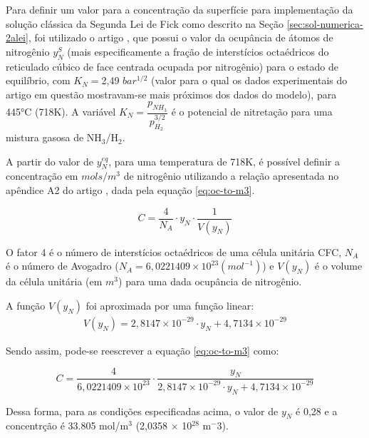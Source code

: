 Para definir um valor para a concentração da superfície para implementação da solução clássica da Segunda Lei de Fick como descrito na Seção \autoref{sec:sol-numerica-2alei}, foi utilizado o artigo  \cite{christiansen2008nitrogen}, que possui o valor da ocupância de átomos de nitrogênio $y_N^{S}$ (mais especificamente a fração de interstícios octaédricos do reticulado cúbico de face centrada ocupada por nitrogênio) para o estado de equilíbrio, com $K_N=$2,49 $bar^{1/2}$ (valor para o qual os dados experimentais do artigo em questão mostravam-se mais próximos dos dados do modelo), para 445°C (718K). A variável $K_N=\dfrac{p_{NH_3}}{p_{H_2}^{3/2}}$ é o potencial de nitretação para uma mistura gasosa de NH$_3$/H$_2$.

A partir do valor de $y_N^{eq}$, para uma temperatura de 718K, é possível definir a concentração em $mols/m^3$ de nitrogênio utilizando a relação apresentada no apêndice A2 do artigo \cite{jespersen2016modelling}, dada pela equação \autoref{eq:oc-to-m3}.

\begin{equation} \label{eq:oc-to-m3}
	C = \dfrac{4}{N_A} \cdot y_N \cdot \dfrac{1}{V(y_N)}
\end{equation}

O fator 4 é o número de interstícios octaédricos de uma célula unitária CFC, $N_A$ é o número de Avogadro ($N_A = 6,0221409 \times 10^{23} (mol^{-1})$) e $V(y_N)$ é o volume da célula unitária (em $m^3$) para uma dada ocupância de nitrogênio.

A função $V(y_N)$ foi aproximada por uma função linear: 
\begin{gather*}
	V(y_N) = 2,8147 \times 10^{-29} \cdot y_N + 4,7134 \times 10^{-29}
\end{gather*}

Sendo assim, pode-se reescrever a equação \autoref{eq:oc-to-m3} como:

\begin{equation} \label{eq:oc-to-m3-full}
	C = \dfrac{4}{6,0221409 \times 10^{23}} \cdot \dfrac{y_N}{2,8147 \times 10^{-29} \cdot y_N + 4,7134 \times 10^{-29}}
\end{equation}

Dessa forma, para as condições especificadas acima, o valor de $y_N$ é 0,28 e a concentrção é 33.805 mol/m$^3$ (2,0358 $\times$ 10$^{28}$ m$^-3$).

\begin{table}[ht]
\centering
\setlength{\doublerulesep}{\arrayrulewidth}
{\def\arraystretch{2}\tabcolsep=10pt
\caption{Parâmetros para concentração na superfície constante}
}
\end{table}

